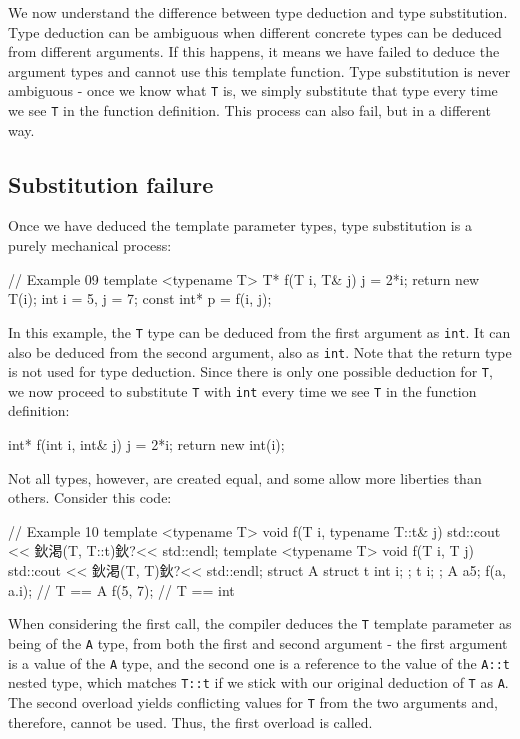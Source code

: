 We now understand the difference between type deduction and type substitution. Type deduction can be ambiguous when different concrete types can be deduced from different arguments. If this happens, it means we have failed to deduce the argument types and cannot use this template function. Type substitution is never ambiguous - once we know what \texttt{T} is, we simply substitute that type every time we see \texttt{T} in the function definition. This process can also fail, but in a different way.

\subsection{Substitution failure}

Once we have deduced the template parameter types, type substitution is a purely mechanical process:

\begin{code}
// Example 09
template <typename T> T* f(T i, T& j) {
  j = 2*i;
  return new T(i);
}
int i = 5, j = 7;
const int* p = f(i, j);
\end{code}

In this example, the \texttt{T} type can be deduced from the first argument as \texttt{int}. It can also be deduced from the second argument, also as \texttt{int}. Note that the return type is not used for type deduction. Since there is only one possible deduction for \texttt{T}, we now proceed to substitute \texttt{T} with \texttt{int} every time we see \texttt{T} in the function definition:

\begin{code}
int* f(int i, int& j) {
  j = 2*i;
  return new int(i);
}
\end{code}

Not all types, however, are created equal, and some allow more liberties than others. Consider this code:

\begin{code}
// Example 10
template <typename T>
void f(T i, typename T::t& j) {
  std::cout << 鈥渇(T, T::t)鈥?<< std::endl;
}
template <typename T>
void f(T i, T j) {
  std::cout << 鈥渇(T, T)鈥?<< std::endl;
}
struct A {
struct t { int i; }; t i; };
A a{5};
f(a, a.i);    // T == A
f(5, 7);    // T == int
\end{code}

When considering the first call, the compiler deduces the \texttt{T} template parameter as being of the \texttt{A} type, from both the first and second argument - the first argument is a value of the \texttt{A} type, and the second one is a reference to the value of the \texttt{A::t} nested type, which matches \texttt{T::t} if we stick with our original deduction of \texttt{T} as \texttt{A}. The second overload yields conflicting values for \texttt{T} from the two arguments and, therefore, cannot be used. Thus, the first overload is called.

